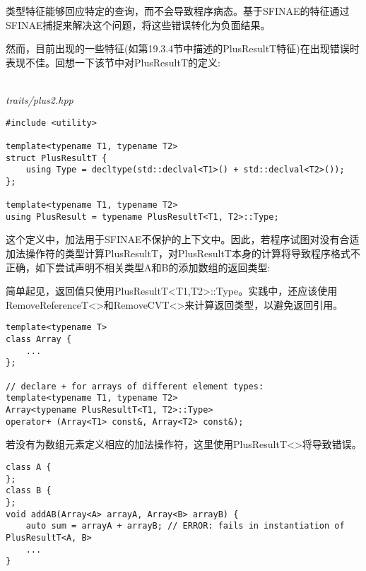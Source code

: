 
类型特征能够回应特定的查询，而不会导致程序病态。基于SFINAE的特征通过SFINAE捕捉来解决这个问题，将这些错误转化为负面结果。

然而，目前出现的一些特征(如第19.3.4节中描述的PlusResultT特征)在出现错误时表现不佳。回想一下该节中对PlusResultT的定义:

\hspace*{\fill} \\ %
\noindent
\textit{traits/plus2.hpp}
\begin{lstlisting}[style=styleCXX]
#include <utility>

template<typename T1, typename T2>
struct PlusResultT {
	using Type = decltype(std::declval<T1>() + std::declval<T2>());
};

template<typename T1, typename T2>
using PlusResult = typename PlusResultT<T1, T2>::Type;
\end{lstlisting}

这个定义中，加法用于SFINAE不保护的上下文中。因此，若程序试图对没有合适加法操作符的类型计算PlusResultT，对PlusResultT本身的计算将导致程序格式不正确，如下尝试声明不相关类型A和B的添加数组的返回类型:

\begin{tcolorbox}[colback=webgreen!5!white,colframe=webgreen!75!black]
\hspace*{0.75cm}简单起见，返回值只使用PlusResultT<T1,T2>::Type。实践中，还应该使用RemoveReferenceT<>和RemoveCVT<>来计算返回类型，以避免返回引用。
\end{tcolorbox}

\begin{lstlisting}[style=styleCXX]
template<typename T>
class Array {
	...
};

// declare + for arrays of different element types:
template<typename T1, typename T2>
Array<typename PlusResultT<T1, T2>::Type>
operator+ (Array<T1> const&, Array<T2> const&);
\end{lstlisting}

若没有为数组元素定义相应的加法操作符，这里使用PlusResultT<>将导致错误。

\begin{lstlisting}[style=styleCXX]
class A {
};
class B {
};
void addAB(Array<A> arrayA, Array<B> arrayB) {
	auto sum = arrayA + arrayB; // ERROR: fails in instantiation of PlusResultT<A, B>
	...
}
\end{lstlisting}

